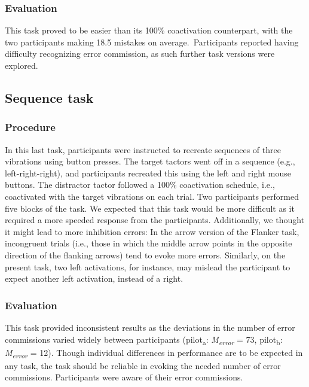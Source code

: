 \documentclass[twocolumn, serif, authordate, empirical]{jote-article}
\begin{document}
 {} \subsubsection*{Evaluation} This task proved to be easier than its 100\%
coactivation counterpart, with the two participants making 18.5 mistakes on average.~Participants reported having difficulty recognizing error commission, as such further task versions were explored.

 {}\subsection*{Sequence task} 

 {} \subsubsection*{Procedure} In this last task, participants were instructed to recreate sequences of three vibrations using button presses. The target tactors went off in a sequence (e.g., left-right-right), and participants recreated this using the left and right mouse buttons. The distractor tactor followed a 100\% coactivation schedule, i.e., coactivated with the target vibrations on each trial. Two participants performed five blocks of the task. We expected that this task would be more difficult as it required a more speeded response from the participants. Additionally, we thought it might lead to more inhibition errors: In the arrow version of the Flanker task, incongruent trials (i.e., those in which the middle arrow points in the opposite direction of the flanking arrows) tend to evoke more errors. Similarly, on the present task, two left activations, for instance, may mislead the participant to expect another left activation, instead of a right.

 {} \subsubsection*{Evaluation} This task provided inconsistent results as the deviations in the number of error commissions varied widely between participants (pilot\textsubscript{a}: \emph{M}\textsubscript{\emph{error}} = 73, pilot\textsubscript{b}: \emph{M}\textsubscript{\emph{error}} = 12). Though individual differences in performance are to be expected in any task, the task should be reliable in evoking the needed number of error commissions. Participants were aware of their error commissions.~
\end{document}
